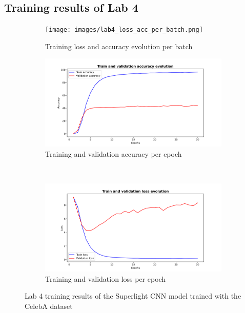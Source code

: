 \documentclass[11pt, a4paper]{article}
\numberwithin{equation}{subsection}
\begin{document}
\begin{appendices}
\section{Training results of Lab 4}\label{results_lab4_appendix}
\begin{figure}[h!]
  \centering
  \begin{subfigure}[b]{0.45\textwidth}
    \texttt{[image: images/lab4\_loss\_acc\_per\_batch.png]}
    \caption{Training loss and accuracy evolution per batch}
    \label{fig:image1}
  \end{subfigure}
  \hspace{0\textwidth} %
  \begin{subfigure}[b]{0.45\textwidth}
    \includegraphics[width=\textwidth]{images/lab4_train_validation_accuracy.png}
    \caption{Training and validation accuracy per epoch}
    \label{fig:image2}
  \end{subfigure}\\[0.5ex] %
  \begin{subfigure}[b]{0.45\textwidth}
    \includegraphics[width=\textwidth]{images/lab4_train_validation_loss.png}
    \caption{Training and validation loss per epoch}
    \label{fig:image3}
  \end{subfigure}
  \caption{Lab 4 training results of the Superlight CNN model trained with the CelebA dataset}
  \label{fig:three_images_3}
\end{figure}

\end{appendices}
\end{document}

